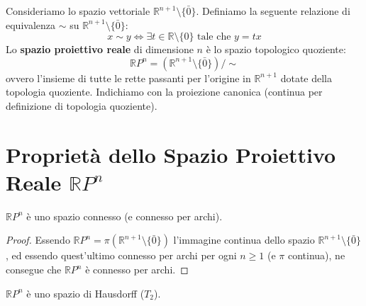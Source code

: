 \begin{definicion}
Consideriamo lo spazio vettoriale $\mathbb{R}^{n+1} \setminus \{\bar{0}\}$.
Definiamo la seguente relazione di equivalenza $\sim$ su $\mathbb{R}^{n+1} \setminus \{\bar{0}\}$:
\[
x \sim y \iff \exists t \in \mathbb{R} \setminus \{0\} \text{ tale che } y = t x
\]
Lo \textbf{spazio proiettivo reale} di dimensione $n$ è lo spazio topologico quoziente:
\[
\mathbb{R}P^n = \left( \mathbb{R}^{n+1} \setminus \{\bar{0}\} \right) \big/ \sim
\]
ovvero l'insieme di tutte le rette passanti per l'origine in $\mathbb{R}^{n+1}$ dotate della topologia quoziente. Indichiamo con
la proiezione canonica (continua per definizione di topologia quoziente).
\end{definicion}

\section{Proprietà dello Spazio Proiettivo Reale $\mathbb{R}P^n$}

\begin{prop}
$\mathbb{R}P^n$ è uno spazio connesso (e connesso per archi).
\end{prop}

\begin{proof}
Essendo $\mathbb{R}P^n = \pi\left(\mathbb{R}^{n+1} \setminus \{\bar{0}\}\right)$ l'immagine continua dello spazio $\mathbb{R}^{n+1} \setminus \{\bar{0}\}$, ed essendo quest'ultimo connesso per archi per ogni $n \geqslant 1$ (e $\pi$ continua), ne consegue che $\mathbb{R}P^n$ è connesso per archi.
\end{proof}

\begin{prop}
$\mathbb{R}P^n$ è uno spazio di Hausdorff ($T_2$).
\end{prop}

